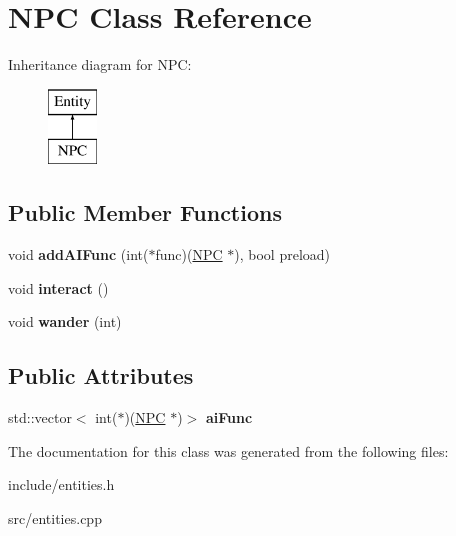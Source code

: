 \hypertarget{classNPC}{}\section{N\+P\+C Class Reference}
\label{classNPC}
Inheritance diagram for N\+P\+C\+:\begin{figure}[H]
\begin{center}
\leavevmode
\includegraphics[height=2.000000cm]{classNPC}
\end{center}
\end{figure}
\subsection*{Public Member Functions}
\begin{DoxyCompactItemize}
\item 
\hypertarget{classNPC_a1dc27a95b74708f8c0c1364c14f61cba}{}void {\bfseries add\+A\+I\+Func} (int($\ast$func)(\hyperlink{classNPC}{N\+P\+C} $\ast$), bool preload)\label{classNPC_a1dc27a95b74708f8c0c1364c14f61cba}

\item 
\hypertarget{classNPC_a06fd48676169693baaa46c260c00bb7d}{}void {\bfseries interact} ()\label{classNPC_a06fd48676169693baaa46c260c00bb7d}

\item 
\hypertarget{classNPC_a6b8833617ae24c65787af4ea6074b897}{}void {\bfseries wander} (int)\label{classNPC_a6b8833617ae24c65787af4ea6074b897}

\end{DoxyCompactItemize}
\subsection*{Public Attributes}
\begin{DoxyCompactItemize}
\item 
\hypertarget{classNPC_ab73690d45357e769bca2ec1bf6c2792d}{}std\+::vector$<$ int($\ast$)(\hyperlink{classNPC}{N\+P\+C} $\ast$)$>$ {\bfseries ai\+Func}\label{classNPC_ab73690d45357e769bca2ec1bf6c2792d}

\end{DoxyCompactItemize}


The documentation for this class was generated from the following files\+:\begin{DoxyCompactItemize}
\item 
include/entities.\+h\item 
src/entities.\+cpp\end{DoxyCompactItemize}
